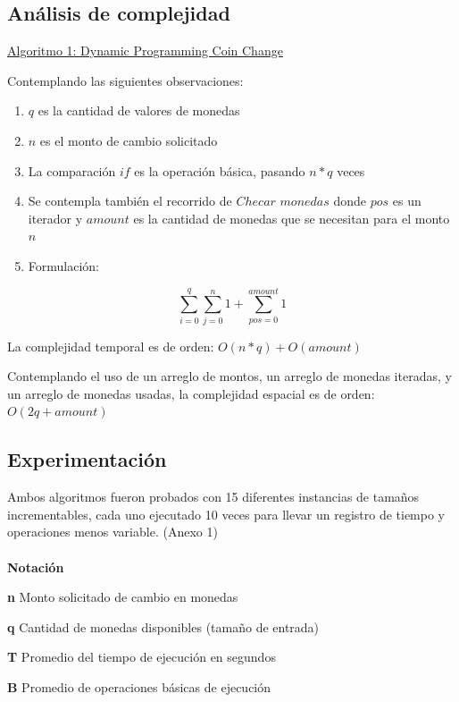 \documentclass[12pt,letterpaper, titlepage, onecolumn]{article}
\begin{document}
\subsection{Análisis de complejidad}
\underline{Algoritmo 1: Dynamic Programming Coin Change}\\
\par Contemplando las siguientes observaciones:
\begin{enumerate}
	\item $q$ es la cantidad de valores de monedas
	\item $n$ es el monto de cambio solicitado
	\item La comparación $if$ es la operación básica, pasando $n*q$ veces
	\item Se contempla también el recorrido de $Checar$ $monedas$ donde 
	$pos$ es un iterador y $amount$ es la cantidad de monedas que se necesitan para
	el monto $n$
	\item Formulación:
\end{enumerate}

\begin{equation}
	\sum_{i=0}^{q} \sum_{j=0}^{n} 1 +\sum_{pos=0}^{amount} 1
\end{equation}

\par La complejidad temporal es de orden: $O(n*q) + O(amount)$
\par Contemplando el uso de un arreglo de montos, un arreglo de monedas iteradas, y un 
arreglo de monedas usadas, la complejidad espacial es de orden: $O(2q + amount)$\\

\subsection{Experimentación}
	\par Ambos algoritmos fueron probados con 15 diferentes instancias de tamaños incrementables, cada uno ejecutado 10 veces para llevar un registro de tiempo y operaciones menos variable. (Anexo 1)\\
	\\
	\textbf{Notación}
	\par\textbf{n}	\indent\indent Monto solicitado de cambio en monedas
	\par\textbf{q}	\indent\indent Cantidad de monedas disponibles  (tamaño de entrada)
	\par\textbf{T}	\indent\indent Promedio del tiempo de ejecución en segundos	
	\par\textbf{B}	\indent\indent Promedio de operaciones básicas de ejecución\\
\end{document}
